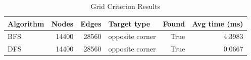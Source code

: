 \begin{table}[H]
\centering
\caption{Grid Criterion Results}
\begin{tabular}{lrrlrr}
\toprule
Algorithm & Nodes & Edges & Target type & Found & Avg time (ms)\\
\midrule
BFS & 14400 & 28560 & opposite corner & True & 4.3983\\
DFS & 14400 & 28560 & opposite corner & True & 0.0667\\
\bottomrule
\end{tabular}
\end{table}
